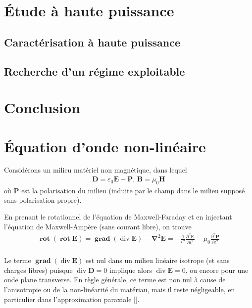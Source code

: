 \documentclass[11pt,a4paper] { article}
\newcommand{\ncite}[1]{[\citenum{#1}]}
\DeclareMathOperator{\divg}{div}
\DeclareMathOperator{\rot}{\mathbf{rot}}
\DeclareMathOperator{\grad}{\mathbf{grad}}
\renewcommand{\v}[1]{\boldsymbol{\mathbf{#1}}}
\begin{document}
\section{Étude à haute puissance}
\subsection{Caractérisation à haute puissance}
\subsection{Recherche d'un régime exploitable}
\section{Conclusion}





\newpage

\appendix
\section{\'Equation d'onde non-linéaire} 
\label{NL}
Considérons un milieu matériel non magnétique, dans lequel
\begin{align*}
	\v D = \varepsilon_0 \v E + \v P \text{, } \v B = \mu_0 \v H
\end{align*}
où $\v P$ est la polarisation du milieu (induite par le champ dans le milieu supposé sans polarisation propre).

En prenant le rotationnel de l'équation de Maxwell-Faraday et en injectant l'équation de Maxwell-Ampère (sans courant libre), on trouve
\begin{align*}
	\rot (\rot \v E) = \grad (\divg \v E) - \v \nabla^2 \v E = - \frac{1}{c^2} \frac{\partial^2 \v E}{\partial t^2} - \mu_0 \frac{\partial^2 \v P}{\partial t^2} \\
\end{align*}

Le terme $\grad (\divg \v E)$ est nul dans un milieu linéaire isotrope (et sans charges libres) puisque $\divg \v D=0$ implique alors $\divg \v E = 0$, ou encore pour une onde plane transverse. En règle générale, ce terme est non nul à cause de l'anisotropie ou de la non-linéarité du matériau, mais il reste négligeable, en particulier dans l'approximation paraxiale \ncite{boyd}.


\end{document}

